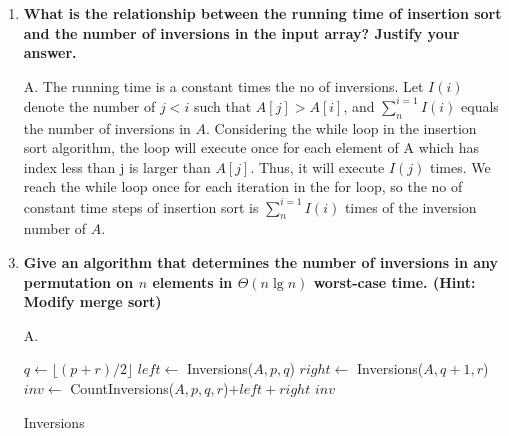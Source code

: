 \documentclass[fontsize=12pt,paper=a4,open=any]{book}
\begin{document}
\begin{enumerate}
\begin{enumerate}
		\item \textbf{What is the relationship between the running time of insertion sort and the number of inversions in the input array? Justify your answer.}
		\item[A.]
		The running time is a constant times the no of inversions. Let $I(i)$ denote the number of $j < i$ such that $A[j] > A[i]$, and $\sum_{n}^{i=1} I(i)$ equals the number of inversions in $A$. Considering the while loop in the insertion sort algorithm, the loop will execute once for each element of A which has index less than j is larger than $A[j]$. Thus, it will execute $I(j)$ times. We reach the while loop once for each iteration in the for loop, so the no of constant time steps of insertion sort is  $\sum_{n}^{i=1} I(i)$ times of the inversion number of $A$.
		
		\item \textbf{Give an algorithm that determines the number of inversions in any permutation on $n$ elements in $\Theta(n \lg n)$ worst-case time. (Hint: Modify merge sort)}
		\item[A.]
		\begin{algorithm}[H]
		
		{
			$q \longleftarrow \lfloor (p+r)/2 \rfloor $\;
			$left \longleftarrow$ Inversions($A, p, q$)\;
			$right \longleftarrow$ Inversions($A, q+1, r$)\;
			$inv \longleftarrow$ CountInversions($A, p, q, r$)$ + left + right$\;
			\Return $inv$\;
		}
		\;
		\caption{Inversions}
		\end{algorithm}
		
		\begin{algorithm}[H]
		

\end{algorithm}
\end{enumerate}
\end{enumerate}
\end{document}

